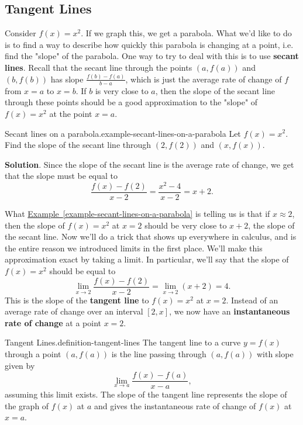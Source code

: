 \documentclass[10pt,]{book}
\newcommand{\terminology}[1]{\textbf{#1}}
\numberwithin{equation}{section}
\begin{document}
\subsection[{Tangent Lines}]{Tangent Lines}\label{subsection-tangent-lines}
\hypertarget{p-75}{}%
Consider \(f(x) = x^{2}\). If we graph this, we get a parabola. What we'd like to do is to find a way to describe how quickly this parabola is changing at a point, i.e. find the "slope" of the parabola. One way to try to deal with this is to use \terminology{secant lines}. Recall that the secant line through the points \((a,f(a))\) and \((b,f(b))\) has slope \(\frac{f(b) - f(a)}{b-a}\), which is just the average rate of change of \(f\) from \(x=a\) to \(x=b\). If \(b\) is very close to \(a\), then the slope of the secant line through these points should be a good approximation to the "slope" of \(f(x) = x^{2}\) at the point \(x=a\).%
\begin{example}{Secant lines on a parabola.}{example-secant-lines-on-a-parabola}%
\hypertarget{p-76}{}%
Let \(f(x) = x^{2}\). Find the slope of the secant line through \((2,f(2))\) and \((x,f(x))\).%
\par\smallskip%
\noindent\textbf{Solution}.\hypertarget{solution-16}{}\quad%
\hypertarget{p-77}{}%
Since the slope of the secant line is the average rate of change, we get that the slope must be equal to%
\begin{equation*}
\frac{f(x) - f(2)}{x-2} = \frac{x^{2} - 4}{x-2} = x+2.
\end{equation*}
%
\end{example}
\hypertarget{p-78}{}%
What \hyperref[example-secant-lines-on-a-parabola]{Example~\ref{example-secant-lines-on-a-parabola}} is telling us is that if \(x\approx2\), then the slope of \(f(x) = x^{2}\) at \(x=2\) should be very close to \(x+2\), the slope of the secant line. Now we'll do a trick that shows up everywhere in calculus, and is the entire reason we introduced limits in the first place. We'll make this approximation exact by taking a limit. In particular, we'll say that the slope of \(f(x) = x^{2}\) should be equal to%
\begin{equation*}
\lim_{x\to2}\frac{f(x)-f(2)}{x-2} = \lim_{x\to2}(x+2) = 4.
\end{equation*}
This is the slope of the \terminology{tangent line} to \(f(x) = x^{2}\) at \(x=2\). Instead of an average rate of change over an interval \([2,x]\), we now have an \terminology{instantaneous rate of change} at a point \(x=2\).%
\begin{definition}{Tangent Lines.}{definition-tangent-lines}%
\hypertarget{p-79}{}%
The tangent line to a curve \(y=f(x)\) through a point \((a,f(a))\) is the line passing through \((a,f(a))\) with slope given by%
\begin{equation*}
\lim_{x\to a}\frac{f(x)-f(a)}{x-a},
\end{equation*}
assuming this limit exists. The slope of the tangent line represents the slope of the graph of \(f(x)\) at \(a\) and gives the instantaneous rate of change of \(f(x)\) at \(x=a\).%
\end{definition}
\end{document}
